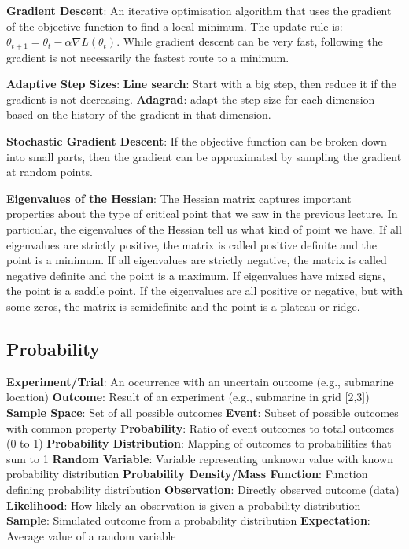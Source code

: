\documentclass{article}
\begin{document}
\textbf{Gradient Descent}: An iterative optimisation algorithm that uses the gradient of the objective function to find a local minimum. The update rule is:
$\theta_{t+1} = \theta_t - \alpha \nabla L(\theta_t)$. While gradient descent can be very fast, following the gradient is not necessarily the fastest route to a minimum.

\textbf{Adaptive Step Sizes}:
\textbf{Line search}: Start with a big step, then reduce it if the gradient is not decreasing.
\textbf{Adagrad}: adapt the step size for each dimension based on the history of the gradient in that dimension.

\textbf{Stochastic Gradient Descent}: If the objective function can be broken down into
small parts, then the gradient can be approximated by sampling the gradient at random points.

\textbf{Eigenvalues of the Hessian}: The Hessian matrix captures important properties about the type of critical
point that we saw in the previous lecture. In particular, the eigenvalues of the Hessian tell us what kind of point we have.
If all eigenvalues are strictly positive, the matrix is called positive definite and the point is a minimum. If all eigenvalues
are strictly negative, the matrix is called negative definite and the point is a maximum. If eigenvalues have mixed signs,
the point is a saddle point. If the eigenvalues are all positive or negative, but with some zeros, the matrix is semidefinite
and the point is a plateau or ridge.



\subsection*{Probability}
\textbf{Experiment/Trial}: An occurrence with an uncertain outcome (e.g., submarine location)
\textbf{Outcome}: Result of an experiment (e.g., submarine in grid [2,3])
\textbf{Sample Space}: Set of all possible outcomes
\textbf{Event}: Subset of possible outcomes with common property
\textbf{Probability}: Ratio of event outcomes to total outcomes (0 to 1)
\textbf{Probability Distribution}: Mapping of outcomes to probabilities that sum to 1
\textbf{Random Variable}: Variable representing unknown value with known probability distribution
\textbf{Probability Density/Mass Function}: Function defining probability distribution
\textbf{Observation}: Directly observed outcome (data)
\textbf{Likelihood}: How likely an observation is given a probability distribution
\textbf{Sample}: Simulated outcome from a probability distribution
\textbf{Expectation}: Average value of a random variable
\end{document}
